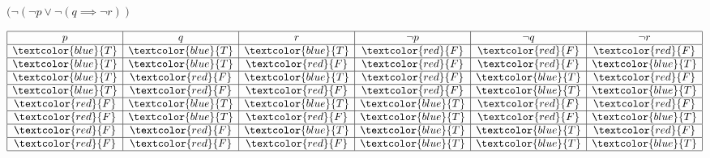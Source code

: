 \documentclass[12pt, letterpaper]{article}
\begin{document}
{\large\centerline{$(\neg(\neg p \lor \neg(q \implies \neg r))$}}

\begin{displaymath}
    \begin{array}{|c|c|c|c|c|c|}
    \hline
    p & q & r & \neg p & \neg q & \neg r\\ %
    \hline %
    \textcolor{blue}{T} & \textcolor{blue}{T} & \textcolor{blue}{T} & \textcolor{red}{F} & \textcolor{red}{F} & \textcolor{red}{F}\\
    \hline
    \textcolor{blue}{T} & \textcolor{blue}{T} & \textcolor{red}{F} & \textcolor{red}{F} & \textcolor{red}{F} & \textcolor{blue}{T}\\
    \hline
    \textcolor{blue}{T} & \textcolor{red}{F} & \textcolor{blue}{T} & \textcolor{red}{F} & \textcolor{blue}{T} & \textcolor{red}{F}\\
    \hline
    \textcolor{blue}{T} & \textcolor{red}{F} & \textcolor{red}{F} & \textcolor{red}{F} & \textcolor{blue}{T} & \textcolor{blue}{T}\\
    \hline
    \textcolor{red}{F} & \textcolor{blue}{T} & \textcolor{blue}{T} & \textcolor{blue}{T} & \textcolor{red}{F} & \textcolor{red}{F}\\
    \hline
    \textcolor{red}{F} & \textcolor{blue}{T} & \textcolor{red}{F} & \textcolor{blue}{T} & \textcolor{red}{F} & \textcolor{blue}{T}\\
    \hline
    \textcolor{red}{F} & \textcolor{red}{F} & \textcolor{blue}{T} & \textcolor{blue}{T} & \textcolor{blue}{T} & \textcolor{red}{F}\\
    \hline
    \textcolor{red}{F} & \textcolor{red}{F} & \textcolor{red}{F} & \textcolor{blue}{T} & \textcolor{blue}{T} & \textcolor{blue}{T}\\
    \hline
    \end{array}
\end{displaymath} \\
\end{document}
